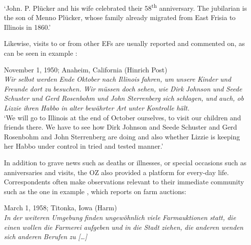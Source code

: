 \documentclass[output=paper]{langsci/langscibook}
\begin{document}
‘John. P. Plücker and his wife celebrated their 58\textsuperscript{th} anniversary. The jubilarian is the son of Menno Plücker, whose family already migrated from East Frisia to Illinois in 1860.’
\z

Likewise, visits to or from other EFs are usually reported and commented on, as can be seen in example :

  
\ea
\label{ex:rocker:7} 
November 1, 1950; Anaheim, California (Hinrich Post)\\

\textit{Wir} \textit{selbst} \textit{werden} \textit{Ende} \textit{Oktober} \textit{nach} \textit{Illinois} \textit{fahren,} \textit{um} \textit{unsere} \textit{Kinder} \textit{und} \textit{Freunde} \textit{dort}  \textit{zu} \textit{besuchen.} \textit{Wir} \textit{müssen} \textit{doch} \textit{sehen,} \textit{wie} \textit{Dirk} \textit{Johnson} \textit{und} \textit{Seede} \textit{Schuster} \textit{und} \textit{Gerd}  \textit{Rosenbohm} \textit{und} \textit{John} \textit{Sterrenberg} \textit{sich} \textit{schlagen,} \textit{und} \textit{auch,} \textit{ob} \textit{Lizzie} \textit{ihren} \textit{Habbo} \textit{in} \textit{alter} \textit{bewährter} \textit{Art} \textit{unter} \textit{Kontrolle} \textit{hält.} \\

‘We will go to Illinois at the end of October ourselves, to visit our children and friends  there. We have to see how Dirk Johnson and Seede Schuster and Gerd Rosenbohm and  John Sterrenberg are doing and also whether Lizzie is keeping her Habbo under control in tried and tested manner.’ 
\z

In addition to grave news such as deaths or illnesses, or special occasions such as anniversaries and visits, the OZ also provided a platform for every-day life. Correspondents often make observations relevant to their immediate community such as the one in example , which reports on farm auctions: 

  
\ea
\label{ex:rocker:8}
March 1, 1958; Titonka, Iowa (Harm)\\

\textit{In} \textit{der} \textit{weiteren} \textit{Umgebung} \textit{finden} \textit{ungewöhnlich} \textit{viele} \textit{Farmauktionen} \textit{statt,} \textit{die} \textit{einen}  \textit{wollen} \textit{die} \textit{Farmerei} \textit{aufgeben} \textit{und} \textit{in} \textit{die} \textit{Stadt} \textit{ziehen,} \textit{die} \textit{anderen} \textit{wenden} \textit{sich} \textit{anderen} \textit{Berufen} \textit{zu} \textit{[…]}\\
\end{document}
